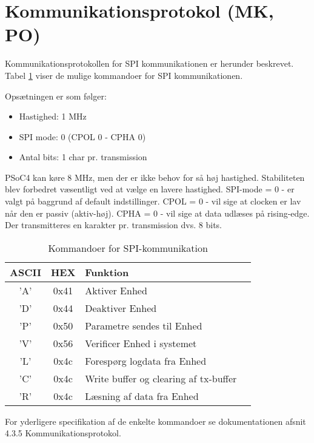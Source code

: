\section{Kommunikationsprotokol (MK, PO)}
Kommunikationsprotokollen for SPI kommunikationen er herunder beskrevet. Tabel \ref{tabel:SWProtokol-kommandoer} viser de mulige kommandoer for SPI kommunikationen. 

Opsætningen er som følger:

\begin{itemize}
  \item Hastighed: 1 MHz
  \item SPI mode: 0 (CPOL 0 - CPHA 0)
  \item Antal bits: 1 char pr. transmission
\end{itemize}

PSoC4 kan køre 8 MHz, men der er ikke behov for så høj hastighed. Stabiliteten blev forbedret væsentligt ved at vælge en lavere hastighed. 
\newline SPI-mode = 0 - er valgt på baggrund af default indstillinger. 
\newline CPOL = 0 - vil sige at clocken er lav når den er passiv (aktiv-høj). 
\newline CPHA = 0 - vil sige at data udlæses på rising-edge. 
\newline Der transmitteres en karakter pr. transmission dvs. 8 bits.

\begin{table}[H]
\caption{Kommandoer for SPI-kommunikation}
\centering
\begin{tabular}{|c|c|l|c|}
\hline 
\textbf{ASCII} & \textbf{HEX} & \textbf{Funktion} \\ 
\hline 
'A' & 0x41 & Aktiver Enhed \\ 
\hline 
'D' & 0x44 & Deaktiver Enhed \\ 
\hline 
'P' & 0x50 & Parametre sendes til Enhed \\
\hline 
'V' & 0x56 & Verificer Enhed i systemet \\ 
\hline
'L' & 0x4c & Forespørg logdata fra Enhed \\ 
\hline
'C' & 0x4c & Write buffer og clearing af tx-buffer  \\
\hline
'R' & 0x4c & Læsning af data fra Enhed \\
\hline
\end{tabular}
\label{tabel:SWProtokol-kommandoer}
\end{table} 


For yderligere specifikation af de enkelte kommandoer se dokumentationen afsnit 4.3.5 Kommunikationsprotokol.